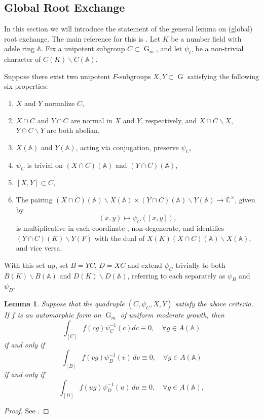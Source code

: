 \documentclass[11pt,reqno]{amsart}
\newtheorem{Lem}[Thm]{Lemma}
\theoremstyle{definition}
\theoremstyle{remark}
\theoremstyle{definition}
\begin{document}
\subsection{Global Root Exchange}
In this section we will introduce the statement of the general lemma on (global) root exchange. The main reference for this is \cite{GRS1}. Let $K$ be a number field with adele ring ${\mathbb A}$. Fix a unipotent subgroup $C\subset \operatorname{G}_m$, and let $\psi_C$ be a non-trivial character of $C(K){\backslash} C({\mathbb A})$.

Suppose there exist two unipotent $F$-subgroups $X,Y\subset \operatorname{G}$ satisfying the following six properties:
\begin{enumerate}
\item $X$ and $Y$ normalize $C$,
\item $X\cap C$ and $Y\cap C$ are normal in $X$ and $Y$, respectively, and $X\cap C{\backslash} X$, $Y\cap C{\backslash} Y$ are both abelian,
\item $X({\mathbb A})$ and $Y({\mathbb A})$, acting via conjugation, preserve $\psi_C$,
\item $\psi_C$ is trivial on $(X\cap C)({\mathbb A})$ and $(Y\cap C)({\mathbb A})$,
\item $[X,Y]\subset C$,
\item The pairing $(X\cap C)({\mathbb A}){\backslash} X({\mathbb A})\times (Y\cap C)({\mathbb A}){\backslash} Y({\mathbb A})\to {\mathbb C}^\times$, given by
\[
(x,y) \mapsto \psi_C([x,y]),
\]
is multiplicative in each coordinate , non-degenerate, and identifies $(Y\cap C)(K){\backslash} Y(F)$ with the dual of $X(K)(X\cap C)({\mathbb A}){\backslash} X({\mathbb A})$, and vice versa.
\end{enumerate} 
With this set up, set $B=YC$, $D=XC$ and extend $\psi_C$ trivially to both $B(K){\backslash} B({\mathbb A})$ and $D(K){\backslash} D({\mathbb A})$, referring to each separately as $\psi_B$ and $\psi_D$.
\begin{Lem}\label{Lem: root exchange}
Suppose that the quadruple $(C,\psi_C, X, Y)$ satisfy the above criteria. If $f$ is an automorphic form on $\operatorname{G}_m$ of uniform moderate growth, then
\begin{equation}\label{eqn: int C}
\displaystyle \int_{[C]}f(cg)\psi_C^{-1}(c)dc \equiv 0, \quad \forall g\in A({\mathbb A})
\end{equation}
if and only if 
\begin{equation}\label{eqn: int B}
\displaystyle \int_{[B]}f(vg)\psi_B^{-1}(v)\,dv \equiv 0, \quad \forall g\in A({\mathbb A}) 
\end{equation}
if and only if 
\begin{equation}\label{eqn: int D}
\displaystyle \int_{[D]}f(ug)\psi_D^{-1}(u)\,du \equiv 0, \quad \forall g\in A({\mathbb A}),
\end{equation}
\end{Lem}
\begin{proof}
See \cite[Section7.1]{GRS1}.
\end{proof}
\end{document}
